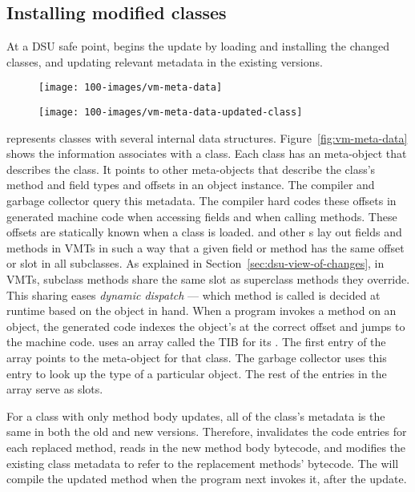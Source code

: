 \subsection{Installing modified classes}
\label{sec:loading}

At a DSU safe point, \JV begins the update by
loading and installing the changed classes, and updating relevant
metadata in the existing versions.

\begin{figure}[t]
\centering
\texttt{[image: 100-images/vm-meta-data]}
\VspaceFixForHangcaption
\end{figure}

\begin{figure}[t]
\centering
\texttt{[image: 100-images/vm-meta-data-updated-class]}
\VspaceFixForHangcaption
\end{figure}

\RVM represents classes with several internal data structures.
Figure~\ref{fig:vm-meta-data} shows the information \RVM associates
with a class.  Each class has an \VMClass meta-object that describes the
class. It points to other meta-objects that describe the class's method and
field types and offsets in an object instance.  The compiler and garbage
collector query this metadata. The compiler hard codes these offsets in
generated machine code when accessing fields and when calling methods.
These offsets are statically known when a class is loaded. \RVM and other
\VM{}s lay out fields and methods in \acfp{VMT} in such a way that a given
field or method has the same offset or slot in all subclasses. As explained
in Section~\ref{sec:dsu-view-of-changes}, in \acsp{VMT}, subclass methods
share the same slot as superclass methods they override. This sharing eases
\emph{dynamic dispatch} --- which method is called is decided at
runtime based on the object in hand. When a program invokes a method on an
object, the generated code indexes the object's \VMT at the correct offset
and jumps to the machine code. \RVM uses an array called the \acf{TIB} for
its \VMT. The first entry of the array points to the \VMClass meta-object
for that class. The garbage collector uses this entry to look up the type of a
particular object. The rest of the entries in the array serve as \VMT
slots.

For a class with only method body updates, all of the class's metadata is
the same in both the old and new versions. Therefore, \JV invalidates the
\TIB code entries for each replaced method, reads in the new method body
bytecode, and modifies the existing class metadata to refer to the
replacement methods' bytecode. The \JIT will compile the updated method
when the program next invokes it, after the update.

